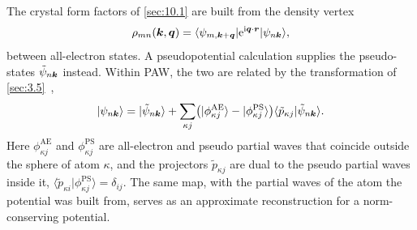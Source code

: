 The crystal form factors of \cref{sec:10.1} are built from the density vertex
\begin{equation}
  \rho_{mn}(\bm{k}, \bm{q}) = \langle\psi_{m,\bm{k}+\bm{q}}|\mathrm{e}^{\mathrm{i}\bm{q}\cdot\bm{r}}|\psi_{n\bm{k}}\rangle ,
  \label{eq:E.2-rho}
\end{equation}
between all-electron states. A pseudopotential calculation supplies the pseudo-states $\tilde\psi_{n\bm{k}}$ instead. Within PAW, the two are related by the transformation of \cref{sec:3.5}~\cite{blochl1994projector},
\begin{equation}
  |\psi_{n\bm{k}}\rangle = |\tilde\psi_{n\bm{k}}\rangle + \sum_{\kappa j}\bigl(|\phi^{\mathrm{AE}}_{\kappa j}\rangle - |\phi^{\mathrm{PS}}_{\kappa j}\rangle\bigr)\langle\tilde p_{\kappa j}|\tilde\psi_{n\bm{k}}\rangle .
  \label{eq:E.2-PAW}
\end{equation}
Here $\phi^{\mathrm{AE}}_{\kappa j}$ and $\phi^{\mathrm{PS}}_{\kappa j}$ are all-electron and pseudo partial waves that coincide outside the sphere of atom $\kappa$, and the projectors $\tilde p_{\kappa j}$ are dual to the pseudo partial waves inside it, $\langle\tilde p_{\kappa i}|\phi^{\mathrm{PS}}_{\kappa j}\rangle = \delta_{ij}$. The same map, with the partial waves of the atom the potential was built from, serves as an approximate reconstruction for a norm-conserving potential.

